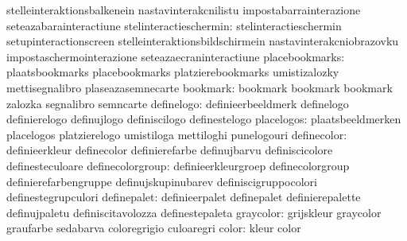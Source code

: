                                   stelleinteraktionsbalkenein      nastavinterakcnilistu
                                  impostabarrainterazione          seteazabarainteractiune
          stelinteractieschermin: stelinteractieschermin           setupinteractionscreen
                                  stelleinteraktionsbildschirmein  nastavinterakcniobrazovku
                                  impostaschermointerazione        seteazaecraninteractiune
                  placebookmarks: plaatsbookmarks                  placebookmarks
                                  platzierebookmarks               umistizalozky
                                  mettisegnalibro                  plaseazasemnecarte
                        bookmark: bookmark                         bookmark
                                  bookmark                         zalozka
                                  segnalibro                       semncarte
                      definelogo: definieerbeeldmerk               definelogo
                                  definierelogo                    definujlogo
                                  definiscilogo                    definestelogo
                      placelogos: plaatsbeeldmerken                placelogos
                                  platzierelogo                    umistiloga
                                  mettiloghi                       punelogouri
                    definecolor:  definieerkleur                   definecolor
                                  definierefarbe                   definujbarvu
                                  definiscicolore                  definesteculoare
               definecolorgroup:  definieerkleurgroep              definecolorgroup
                                  definierefarbengruppe            definujskupinubarev
                                  definiscigruppocolori            definestegrupculori
                    definepalet:  definieerpalet                   definepalet
                                  definierepalette                 definujpaletu
                                  definiscitavolozza               definestepaleta
                      graycolor:  grijskleur                       graycolor
                                  graufarbe                        sedabarva
                                  coloregrigio                     culoaregri
                          color:  kleur                            color

